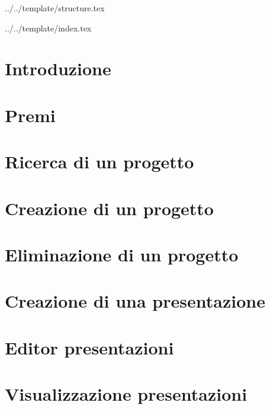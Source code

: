 

\def\DOCUMENTO{Manuale Utente}
\def\VERSIONE{1.0.0}

\def\DESCRIZIONE{Documento che facilita l'utilizzo dell'applicazione da parte dell'utente.}

\def\REDATTORE {Agostinetto Matteo}
\def\VERIFICATORE {Crespan Emanuele}
\def\RESPONSABILE {Suierica Bogdan}

\def\USO {Esterno}

\def\DISTRIBUZIONE {\GRUPPO{}\\ & \COMMITTENTE{}\\ & \PROPONENTE{}\\}


\def\INDICE	{true}
\def\TABELLE {true}
\def\FIGURE {true}


 {../../template/structure.tex}


 {../../template/index.tex}

\section{Introduzione}

\newpage

\section{Premi}

\newpage

\section{Ricerca di un progetto}

\newpage

\section{Creazione di un progetto}


\section{Eliminazione di un progetto}


\section{Creazione di una presentazione}

\newpage

\section{Editor presentazioni}

\newpage


\section{Visualizzazione presentazioni}

\newpage






